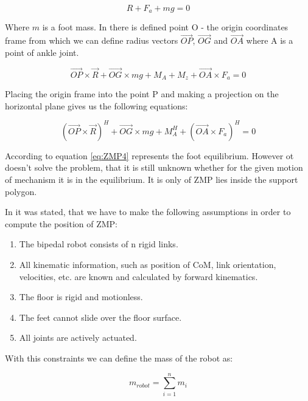 \documentclass[11pt,a4paper]{report}
\begin{document}
		\begin{equation}\label{eq:ZMP2}
			R + F_a + mg = 0
		\end{equation}

		Where $m$ is a foot mass. In \cite{vukobratovic2004zero} there is defined  point O - the origin coordinates frame from which we can define radius vectors $\vec{OP}$, $\vec{OG}$ and $\vec{OA}$ where A is a point of ankle joint.

		\begin{equation}\label{eq:ZMP3}
			\vec{OP} \times \vec{R} + \vec{OG} \times mg + M_A + M_z + \vec{OA} \times F_a = 0
		\end{equation}

		Placing the origin frame into the point P and making a projection on the horizontal plane gives us the following equations: 

		\begin{equation}\label{eq:ZMP4}
			(\vec{OP} \times \vec{R})^H + \vec{OG} \times mg + M_A^H + (\vec{OA} \times F_a)^H = 0
		\end{equation}

		According to \cite{vukobratovic2004zero} equation \ref{eq:ZMP4} represents the foot equilibrium. However ot doesn't solve the problem, that it is still unknown whether for the given motion of mechanism it is in the equilibrium. It is only of ZMP lies inside the support polygon.
		
		In \cite{dekker2009zero} it was stated, that we have to make the following assumptions in order to compute the position of ZMP:

		\begin{enumerate}
			\item
				The bipedal robot consists of n rigid links.
			\item
				All kinematic information, such as position of CoM, link orientation, velocities, etc. are known and calculated by forward kinematics.
			\item
				The floor is rigid and motionless.
			\item
				The feet cannot slide over the floor surface.
			\item
				All joints are actively actuated.
		\end{enumerate}
	
		With this constraints we can define the mass of the robot as:
	
		\begin{equation}\label{eq:ZMP5}
			m_{robot} = \sum^n_{i=1}{m_i}
		\end{equation}
\end{document}
